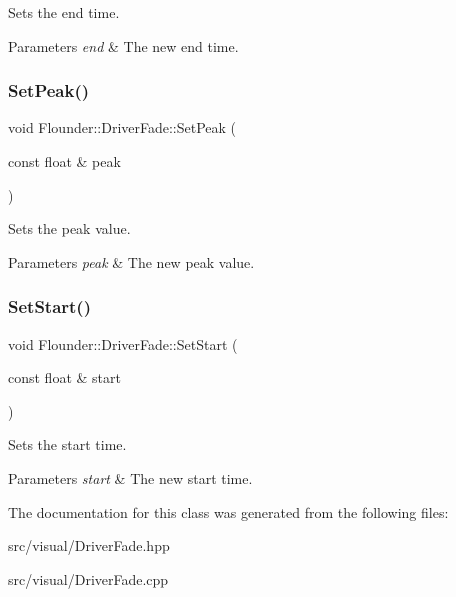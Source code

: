 Sets the end time. 


\begin{DoxyParams}{Parameters}
{\em end} & The new end time. \\
\hline
\end{DoxyParams}
\mbox{\label{class_flounder_1_1_driver_fade_a9d5a179f9a0f5d500176291020bd406d}} 
\subsubsection{\texorpdfstring{Set\+Peak()}{SetPeak()}}
{\footnotesize\ttfamily void Flounder\+::\+Driver\+Fade\+::\+Set\+Peak (\begin{DoxyParamCaption}\item[{const float \&}]{peak }\end{DoxyParamCaption})\hspace{0.3cm}{\ttfamily [inline]}}



Sets the peak value. 


\begin{DoxyParams}{Parameters}
{\em peak} & The new peak value. \\
\hline
\end{DoxyParams}
\mbox{\label{class_flounder_1_1_driver_fade_a24d8c27ded31c31ef2efc66bbee1ae0e}} 
\subsubsection{\texorpdfstring{Set\+Start()}{SetStart()}}
{\footnotesize\ttfamily void Flounder\+::\+Driver\+Fade\+::\+Set\+Start (\begin{DoxyParamCaption}\item[{const float \&}]{start }\end{DoxyParamCaption})\hspace{0.3cm}{\ttfamily [inline]}}



Sets the start time. 


\begin{DoxyParams}{Parameters}
{\em start} & The new start time. \\
\hline
\end{DoxyParams}


The documentation for this class was generated from the following files\+:\begin{DoxyCompactItemize}
\item 
src/visual/Driver\+Fade.\+hpp\item 
src/visual/Driver\+Fade.\+cpp\end{DoxyCompactItemize}

